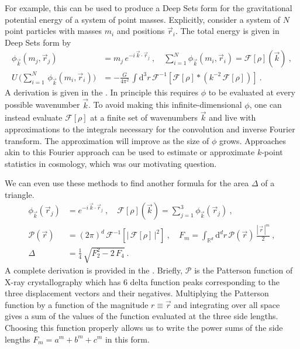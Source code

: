 \documentclass[10pt]{article}
\renewcommand{\d}{\mathrm{d}}
\newcommand{\abs}[1]{|\,{#1}\,|}
\begin{document}
For example, this can be used to produce a Deep Sets form for the gravitational potential energy of a system of point masses. Explicitly, consider a system of $N$ point particles with masses $m_i$ and positions $\vec{r}_i$.
The total energy is given in Deep Sets form by
\begin{align}
    \phi_{\vec{k}}(m_j, \vec{r}_j)
    &=m_j \, e^{-i \, \vec{k} \cdot \vec{r}_j}
    ~,
    \quad
    \sum_{i=1}^{N} \phi_{\vec{k}}(m_i, \vec{r}_i)
    = \mathcal{F}[\rho](\vec{k})~,
    \nonumber\\
    U \, \big( \sum_{i=1}^{N} \, \phi_{\vec{k}}(m_i, \vec{r}_i) \big)
    &= -\frac{G}{4 \pi^2} \,
        \int \d^3 r \,
        \mathcal{F}^{-1} \left[
            \mathcal{F}[\rho] \ast \left(
            k^{-2} \, \mathcal{F}[\rho] \right)
        \right]~.
    \label{eq:EnergyDeepSets}
\end{align}
A derivation is given in the .
In principle this requires $\phi$ to be evaluated at every possible wavenumber $\vec{k}$.
To avoid making this infinite-dimensional $\phi$, one can instead evaluate $\mathcal{F}[\rho]$ at a finite set of wavenumbers $\vec{k}$ and live with approximations to the integrals necessary for the convolution and inverse Fourier transform.
The approximation will improve as the size of $\phi$ grows.
Approaches akin to this Fourier approach can be used \citep[and are used; e.g.,][]{Portillo+2018,Philcox+2022ENCORE} to estimate or approximate $k$-point statistics in cosmology, which was our motivating question.

We can even use these methods to find another formula for the area $\Delta$ of a triangle.
\begin{align}
    \phi_{\vec{k}} (\vec{r}_j) &= e^{-i \, \vec{k} \cdot \vec{r}_j}~,
    \quad
    \mathcal{F}[\rho](\vec{k}) = \sum_{j=1}^{3} \phi_{\vec{k}}(\vec{r}_j)~,
    \nonumber\\
    \mathcal{P}(\vec{r}) &= (2\pi)^d \, \mathcal{F}^{-1} \left[ 
    \abs{ \mathcal{F}[\rho] }^2 \right]~,
    \quad
    F_m = \int_{\mathbb{R}^d} \d^d r \, \mathcal{P}(\vec{r}) \, \frac{\abs{\vec{r}}^m}{2}~,
    \nonumber\\
    \Delta
    &= \frac{1}{4} \, \sqrt{F_2^2 - 2 \, F_4}~.
\end{align}
A complete derivation is provided in the .
Briefly, $\mathcal{P}$ is the Patterson function of X-ray crystallography \citep{Patterson1934} which has 6 delta function peaks corresponding to the three displacement vectors and their negatives. 
Multiplying the Patterson function by a function of the magnitude $r \equiv \vec{r}$ and integrating over all space gives a sum of the values of the function evaluated at the three side lengths. 
Choosing this function properly allows us to write the power sums of the side lengths $F_m = a^m+b^m+c^m$ in this form.
\end{document}
